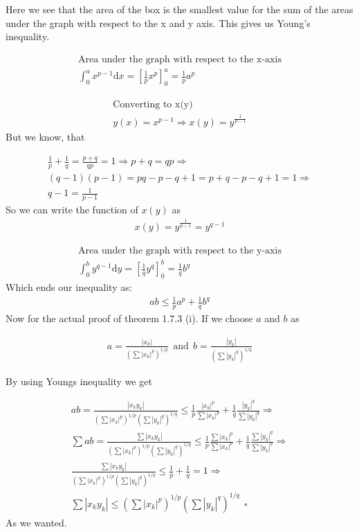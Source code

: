 \documentclass{article}
\begin{document}
Here we see that the area of the box is the smallest value for the sum of the areas under the graph with respect to the x and y axis. This gives us Young's inequality.


\begin{gather*}
\text{Area under the graph with respect to the x-axis} \\
    \int_0^a x^{p-1} \text{d}x = \left[\frac{1}{p}x^p\right]_0^a = \frac{1}{p}a^p
\end{gather*}

\begin{gather*}
\text{Converting to x(y)} \\
    y(x)=x^{p-1} \Rightarrow x(y)=y^{\frac{1}{p-1}}
\end{gather*}
But we know, that 

\begin{gather*}
    \frac{1}{p}+\frac{1}{q}= \frac{p+q}{qp}=1 \Rightarrow p+q = qp \Rightarrow \\
    (q-1)(p-1)=pq-p-q+1 = p+q-p-q+1=1 \Rightarrow \\ 
    q-1 = \frac{1}{p-1}
\end{gather*}
So we can write the function of $x(y)$ as
\begin{gather*}
    x(y)=y^{\frac{1}{p-1}}=y^{q-1}
\end{gather*}

\begin{gather*}
\text{Area under the graph with respect to the y-axis}\\
    \int_0^b y^{q-1} \text{d}y = \left[\frac{1}{q}y^q\right]_0^b = \frac{1}{q}b^q
\end{gather*}
Which ends our inequality as: 
\begin{gather*}
    ab \leq \frac{1}{p}a^p + \frac{1}{q}b^q
\end{gather*}
Now for the actual proof of theorem 1.7.3 (i). If we choose $a$ and $b$ as

\begin{gather*}
    a=\frac{|x_k|}{\left(\sum |x_k|^p\right)^{1/p}} \: \:\text{and}\: \: b= \frac{|y_k|}{\left(\sum |y_k|^q\right)^{1/q}}
\end{gather*}

By using Youngs inequality we get

\begin{gather*}
    ab = \frac{|x_k y_k|}{\left(\sum |x_k|^p\right)^{1/p}\left(\sum |y_k|^q\right)^{1/q}} \leq \frac{1}{p} \frac{|x_k|^p}{\sum |x_k|^p}+\frac{1}{q} \frac{|y_k|^q}{\sum |y_k|^q} \Rightarrow \\
    \sum ab = \frac{\sum|x_k y_k|}{\left(\sum |x_k|^p\right)^{1/p}\left(\sum |y_k|^q\right)^{1/q}} \leq \frac{1}{p} \frac{\sum|x_k|^p}{\sum |x_k|^p}+\frac{1}{q} \frac{\sum|y_k|^q}{\sum |y_k|^q} \Rightarrow \\
    \frac{\sum|x_k y_k|}{\left(\sum |x_k|^p\right)^{1/p}\left(\sum |y_k|^q\right)^{1/q}} \leq \frac{1}{p}+\frac{1}{q}=1 \Rightarrow \\
    \sum|x_k y_k| \leq \left(\sum |x_k|^p\right)^{1/p}\left(\sum |y_k|^q\right)^{1/q} \: \: \square
\end{gather*}
As we wanted.
\end{document}
